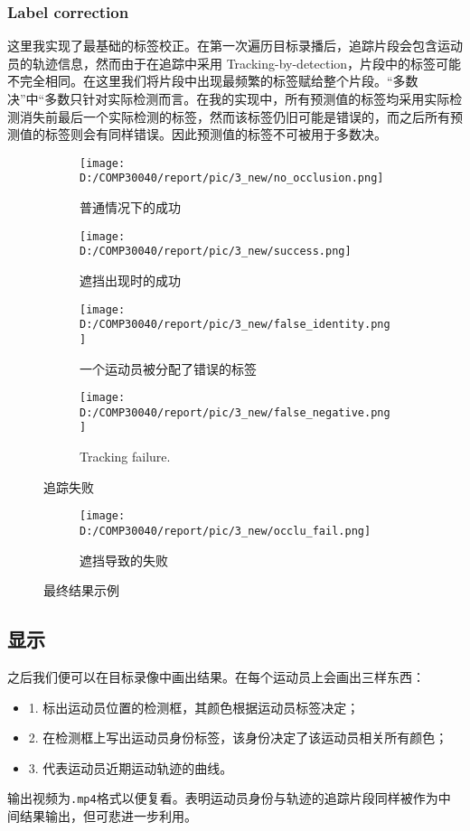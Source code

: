 \documentclass{article}
\begin{document}
\subsubsection{Label correction}
这里我实现了最基础的标签校正。在第一次遍历目标录播后，追踪片段会包含运动员的轨迹信息，然而由于在追踪中采用 Tracking-by-detection，片段中的标签可能不完全相同。在这里我们将片段中出现最频繁的标签赋给整个片段。“多数决”中“多数只针对实际检测而言。在我的实现中，所有预测值的标签均采用实际检测消失前最后一个实际检测的标签，然而该标签仍旧可能是错误的，而之后所有预测值的标签则会有同样错误。因此预测值的标签不可被用于多数决。
\begin{figure}[h!]
  \begin{subfigure}[b]{\linewidth}
  \centering
    \texttt{[image: D:/COMP30040/report/pic/3\_new/no\_occlusion.png]} 
    \caption{普通情况下的成功}
  \end{subfigure}
  \begin{subfigure}[b]{\linewidth}
  \centering
    \texttt{[image: D:/COMP30040/report/pic/3\_new/success.png]} 
    \caption{遮挡出现时的成功}
  \end{subfigure}
  \begin{subfigure}[b]{\linewidth}
  \centering
    \texttt{[image: D:/COMP30040/report/pic/3\_new/false\_identity.png]} 
    \caption{一个运动员被分配了错误的标签}
  \end{subfigure}
  \begin{subfigure}[b]{\linewidth}
  \centering
    \texttt{[image: D:/COMP30040/report/pic/3\_new/false\_negative.png]} 
    \caption{Tracking failure.}
  \end{subfigure}
  \caption{追踪失败}
  \begin{subfigure}[b]{\linewidth}
  \centering
    \texttt{[image: D:/COMP30040/report/pic/3\_new/occlu\_fail.png]} 
    \caption{遮挡导致的失败}
  \end{subfigure}
  \caption{最终结果示例}
\end{figure}

\subsection{显示}
之后我们便可以在目标录像中画出结果。在每个运动员上会画出三样东西：
\begin{itemize}
\item 1. 标出运动员位置的检测框，其颜色根据运动员标签决定；
\item 2. 在检测框上写出运动员身份标签，该身份决定了该运动员相关所有颜色；
\item 3. 代表运动员近期运动轨迹的曲线。
\end{itemize}
输出视频为\texttt{.mp4}格式以便复看。表明运动员身份与轨迹的追踪片段同样被作为中间结果输出，但可悲进一步利用。\\
\end{document}
